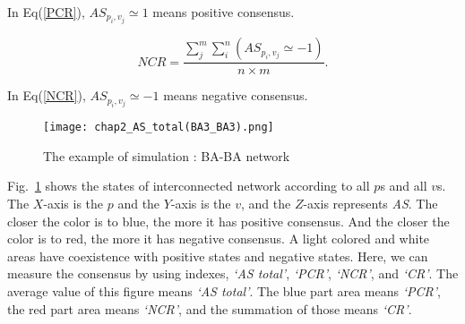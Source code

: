 In Eq(\ref{PCR}),  ${A{S_{{p _i},{v _j}}} \simeq  1}$ means positive consensus.

\begin{equation}
NCR = \frac{{\sum\limits_j^m {\sum\limits_i^n {(A{S_{{p _i},{v _j}}} \simeq   - 1)} } }}{{n \times m}}.
\label{NCR}
\end{equation}

In Eq(\ref{NCR}), ${A{S_{{p _i},{v _j}}} \simeq  -1}$ means negative consensus.


\begin{figure}[!htb]
	\centering
	\texttt{[image: chap2\_AS\_total(BA3\_BA3).png]}
	\caption{The example of simulation : BA-BA network}
	\label{chap2_AS_total(BA3_BA3)}
\end{figure}

Fig.~\ref{chap2_AS_total(BA3_BA3)} shows the states of interconnected network according to all $p$s and all $v$s. The $X$-axis is the $p$ and the $Y$-axis is the $v$, and the $Z$-axis represents \textit{AS}. The closer the color is to blue, the more it has positive consensus. And the closer the color is to red, the more it has negative consensus. A light colored and white areas have coexistence with positive states and negative states. Here, we can measure the consensus by using indexes, \textit{`AS total'}, \textit{`PCR'}, \textit{`NCR'}, and \textit{`CR'}. The average value of this figure means \textit{`AS total'}. The blue part area means \textit{`PCR'}, the red part area means \textit{`NCR'}, and the summation of those means \textit{`CR'}. \\



    
